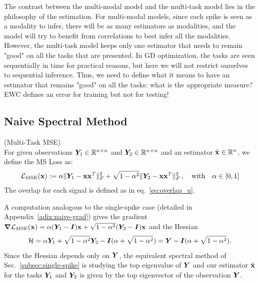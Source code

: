 \documentclass[11pt]{article}
\begin{document}
\noindent
The contrast between the multi-modal model and the multi-task model lies in the philosophy of the estimation. For multi-modal models, since each spike is seen as a modality to infer, there will be as many estimators as modalities, and the model will try to benefit from correlations to best infer all the modalities. However, the multi-task model keeps only one estimator that needs to remain "good" on all the tasks that are presented. In GD optimization, the tasks are seen sequentially in time for practical reasons, but here we will not restrict ourselves to sequential inference. Thus, we need to define what it means to have an estimator that remains "good" on all the tasks: what is the appropriate measure? EWC defines an error for training but not for testing!



\subsection{Naive Spectral Method}

\begin{defn}(Multi-Task MSE)\leavevmode\\
    For given observations $\bm{Y}_1 \in {\mathbb R}^{n\times n}$ and $\bm{Y}_2 \in {\mathbb R}^{n \times n}$ and an estimator $\hat{\boldsymbol{\mathbf{x}}} \in {\mathbb R}^n$, we define the MS Loss as:
    \begin{align}
        \mathcal{L}_{\mathrm{MSE}}(\boldsymbol{\mathbf{x}}) := \alpha  \|\bm{Y}_1 - \boldsymbol{\mathbf{x}}\boldsymbol{\mathbf{x}}^T \|^2_F + \sqrt{1-\alpha^2}  \|\bm{Y}_2 - \boldsymbol{\mathbf{x}}\boldsymbol{\mathbf{x}}^T \|^2_F\,,\quad \mathrm{with}\quad \alpha \in [0,1]
    \end{align}
The overlap for each signal is defined as in eq.~\ref{eq:overlap_u}.
\end{defn}
\noindent
A computation analogous to the single-spike case (detailed in Appendix~\ref{adix:naive-grad}) gives the gradient $\boldsymbol{\mathbf{\nabla}} \mathcal{L}_{\mathrm{MSE}}(\boldsymbol{\mathbf{x}}) = \alpha (\bm{Y}_1 - \bm{I})\boldsymbol{\mathbf{x}} + \sqrt{1-\alpha^2} (\bm{Y}_2 - \bm{I})\boldsymbol{\mathbf{x}}$ and the Hessian
\begin{equation}
    \mathcal{H} = \alpha \bm{Y}_1 + \sqrt{1-\alpha^2} \bm{Y}_2 - \bm{I} ( \alpha + \sqrt{1-\alpha^2}) = \bm{Y} - \bm{I} ( \alpha + \sqrt{1-\alpha^2}).
\end{equation}
\noindent
Since the Hessian depends only on $\bm{Y}$, the equivalent spectral method of Sec.~\ref{subsec:single-spike} is studying the top eigenvalue of $\bm{Y}$ and our estimator $\hat{\boldsymbol{\mathbf{x}}}$ for the tasks $\bm{Y}_1$ and $\bm{Y}_2$ is given by the top eigenvector of the observation $\bm{Y}$.
\end{document}
